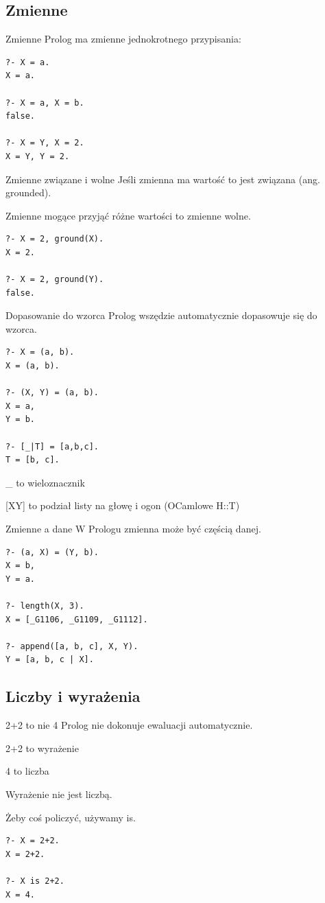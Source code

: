\documentclass[blue]{beamer}
\begin{document}
\subsection{Zmienne}
\begin{frame}[fragile]{Zmienne}
Prolog ma zmienne jednokrotnego przypisania:
\begin{lstlisting}
?- X = a.
X = a.

?- X = a, X = b.
false.

?- X = Y, X = 2.
X = Y, Y = 2.
\end{lstlisting}
\end{frame}
\begin{frame}[fragile]{Zmienne związane i wolne}
Jeśli zmienna ma wartość to jest związana (ang. grounded).

Zmienne mogące przyjąć różne wartości to zmienne wolne.
\begin{lstlisting}
?- X = 2, ground(X).
X = 2.

?- X = 2, ground(Y).
false.
\end{lstlisting}
\end{frame}
\begin{frame}[fragile]{Dopasowanie do wzorca}
Prolog wszędzie automatycznie dopasowuje się do wzorca.
\begin{lstlisting}
?- X = (a, b).
X = (a, b).

?- (X, Y) = (a, b).
X = a,
Y = b.

?- [_|T] = [a,b,c].
T = [b, c].
\end{lstlisting}
\_ to wieloznacznik

[X\textbar Y] to podział listy na głowę i ogon (OCamlowe H::T)
\end{frame}
\begin{frame}[fragile]{Zmienne a dane}
W Prologu zmienna może być częścią danej.
\begin{lstlisting}
?- (a, X) = (Y, b).
X = b,
Y = a.

?- length(X, 3).
X = [_G1106, _G1109, _G1112].

?- append([a, b, c], X, Y).
Y = [a, b, c | X].
\end{lstlisting}
\end{frame}
\subsection{Liczby i wyrażenia}
\begin{frame}[fragile]{2+2 to nie 4}
Prolog nie dokonuje ewaluacji automatycznie.

2+2 to wyrażenie

4 to liczba

Wyrażenie nie jest liczbą.

Żeby coś policzyć, używamy is.

\begin{lstlisting}
?- X = 2+2.
X = 2+2.

?- X is 2+2.
X = 4.
\end{lstlisting}
\end{frame}
\end{document}
